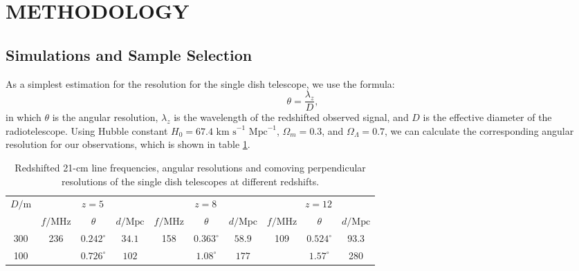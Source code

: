 \section{METHODOLOGY}
\subsection{Simulations and Sample Selection}
As a simplest estimation for the resolution for the single dish telescope, we use the formula:
\begin{equation}
    \theta = \frac{\lambda_z}{D},
\end{equation}
in which $\theta$ is the angular resolution, $\lambda_z$ is the wavelength of the redshifted observed signal, and $D$ is the effective diameter of the radiotelescope. Using Hubble constant $ H_0 = 67.4 \text{ km s}^{-1} \text{ Mpc}^{-1}$, $\Omega_m = 0.3$, and $\Omega_\Lambda = 0.7$, we can calculate the corresponding angular resolution for our observations, which is shown in table \ref{tab:angular_resolution}.

\begin{table}[h]
    \caption{Redshifted 21-cm line frequencies, angular resolutions and comoving perpendicular resolutions of the single dish telescopes at different redshifts.}
    \label{tab:angular_resolution}
    \centering
    \begin{tabular}{cccccccccc}
        \toprule
        \multirow{2}{*}{$D/\text{m}$}&\multicolumn{3}{c}{$z=5$}&\multicolumn{3}{c}{$z=8$}&\multicolumn{3}{c}{$z=12$}\\
        \cmidrule(lr){2-10}
        &$f/\text{MHz}$&$\theta$&$d/\text{Mpc}$&$f/\text{MHz}$&$\theta$&$d/\text{Mpc}$&$f/\text{MHz}$&$\theta$&$d/\text{Mpc}$\\
        \midrule
        300         &\multirow{2}{*}{236}&$0.242^\circ$&$34.1$&\multirow{2}{*}{158}&$0.363^\circ$& $58.9$&\multirow{2}{*}{109}&$0.524^\circ$&93.3\\
        100         &&$0.726^\circ$&$102$ &&$1.08^\circ$& $177$&&$1.57^\circ$&280\\
        \bottomrule
    \end{tabular}
\end{table}